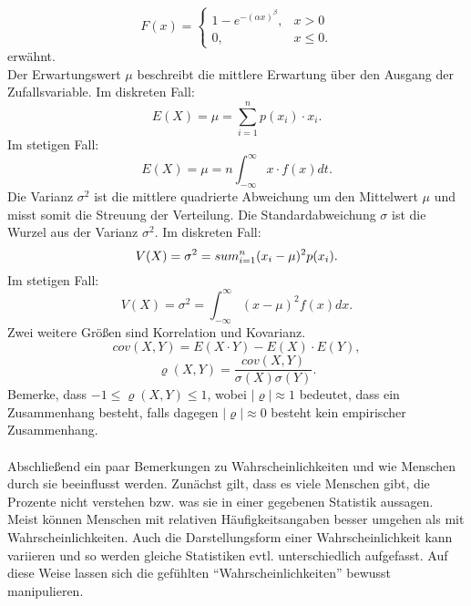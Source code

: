 \[
	F(x) = \left\lbrace
		\begin{array}{ll}
			1-e^{-(\alpha x)^\beta}, & x > 0\\
			0, & x \leq 0.
		\end{array}
	\right.
\]
erwähnt.\\
Der Erwartungswert \(\mu\) beschreibt  die mittlere Erwartung  über den Ausgang der Zufallsvariable. Im diskreten Fall:
\[
	E(X) = \mu = \sum_{i=1}^n p(x_i) \cdot x_i.
\]
Im stetigen Fall:
\[
	E(X) = \mu =n \int_{-\infty}^\infty x \cdot f(x) dt.
\]
Die Varianz \(\sigma^2\) ist die mittlere quadrierte Abweichung um den Mittelwert \(\mu\) und misst somit die Streuung der Verteilung.
Die Standardabweichung \(\sigma\) ist die Wurzel aus der Varianz \(\sigma^2\). Im diskreten Fall:
\[
	V(X) = \sigma^2 = \\sum_{i=1}^n (x_i-\mu)^2p(x_i).
\]
Im stetigen Fall:
\[
	V(X) = \sigma^2 = \int_{-\infty}^\infty (x-\mu)^2f(x)dx.
\]
Zwei weitere Größen sind Korrelation und Kovarianz.
\[
	cov(X, Y) = E(X \cdot Y) - E(X) \cdot E(Y),
\]
\[
	\varrho(X, Y) = \frac{cov(X, Y)}{\sigma(X)\sigma(Y)}.
\]
Bemerke, dass \(-1 \leq \varrho(X, Y) \leq 1\), wobei \(\left|\varrho\right| \approx 1\) bedeutet, dass ein Zusammenhang besteht, falls dagegen \(\left|\varrho\right| \approx 0 \) besteht kein empirischer Zusammenhang.\\
\ \\
Abschließend ein paar Bemerkungen zu Wahrscheinlichkeiten und wie Menschen durch sie beeinflusst werden. Zunächst gilt, dass es viele Menschen gibt, die Prozente nicht verstehen bzw. was sie in einer gegebenen Statistik aussagen. Meist können Menschen mit relativen Häufigkeitsangaben besser umgehen als mit Wahrscheinlichkeiten. Auch die Darstellungsform einer Wahrscheinlichkeit kann variieren und so werden gleiche Statistiken evtl. unterschiedlich aufgefasst. Auf diese Weise lassen sich die gefühlten ``Wahrscheinlichkeiten'' bewusst manipulieren.
